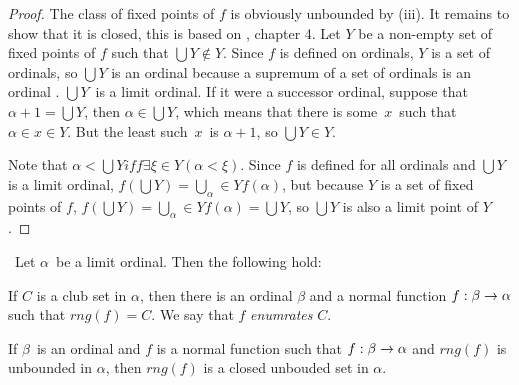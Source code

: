 \begin{proof}
\item The class of fixed points of $f$ is obviously unbounded by (iii).
It remains to show that it is closed, this is based on \cite{DrakeBook}, chapter 4. Let $Y$ be a non-empty set of fixed points of $f$ such that $\bigcup Y \not\in Y$. Since $f$ is defined on ordinals, $Y$ is a set of ordinals, so $\bigcup Y$ is an ordinal because a supremum of a set of ordinals is an ordinal%
. $\bigcup Y$ is a limit ordinal. If it were a successor ordinal, suppose that $\alpha+1 = \bigcup Y$, then $\alpha \in \bigcup Y$, which means that there is some~$x$~such that $\alpha \in x \in Y$. But the least such~$x$~is $\alpha+1$, so $\bigcup Y \in Y$.

Note that $\alpha < \bigcup Y iff \exists \xi \in Y (\alpha < \xi)$. Since $f$ is defined for all ordinals and $\bigcup Y$ is a limit ordinal, $f(\bigcup Y) = \bigcup_\alpha \in Y f(\alpha)$, but because $Y$ is a set of fixed points of $f$, $f(\bigcup Y) = \bigcup_\alpha \in Y f(\alpha) = \bigcup Y$, so $\bigcup Y$ is also a limit point of $Y$.
\ece
\end{proof}

\begin{lemma}\label{lemma:normal_enumerates_club}\
Let $\alpha$ be a limit ordinal. Then the following hold:
\bce[(i)] %
\item If $C$ is a club set in $\alpha$, then there is an ordinal $\beta$ and a normal function $f: \beta \rightarrow \alpha$ such that $rng(f) = C$. We say that $f$ \emph{enumrates} $C$.
\item If $\beta$ is an ordinal and $f$ is a normal function such that $f: \beta \rightarrow \alpha$ and $rng(f)$ is unbounded in $\alpha$, then $rng(f)$ is a closed unbouded set in $\alpha$.
\ece
\end{lemma}


